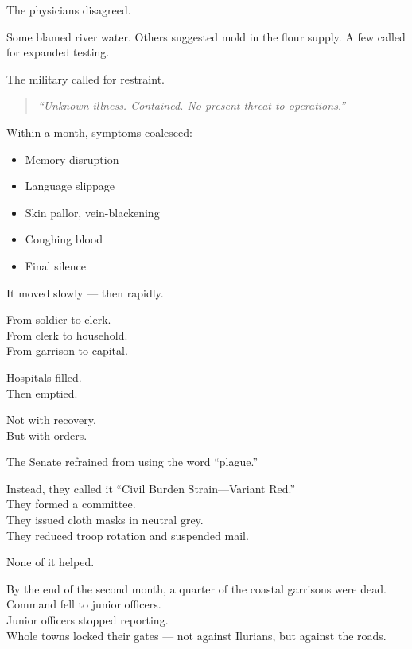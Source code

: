 \documentclass[12pt]{article}
\begin{document}
The physicians disagreed.

Some blamed river water. Others suggested mold in the flour supply. A few called for expanded testing.

The military called for restraint.

\begin{quote}
\textit{“Unknown illness. Contained. No present threat to operations.”}
\end{quote}

\vspace{1em}

Within a month, symptoms coalesced:

\begin{itemize}
  \item Memory disruption
  \item Language slippage
  \item Skin pallor, vein-blackening
  \item Coughing blood
  \item Final silence
\end{itemize}

It moved slowly — then rapidly.

From soldier to clerk.\\
From clerk to household.\\
From garrison to capital.

Hospitals filled.\\
Then emptied.

Not with recovery.\\
But with orders.

\vspace{1em}

The Senate refrained from using the word “plague.”

Instead, they called it “Civil Burden Strain—Variant Red.”\\
They formed a committee.\\
They issued cloth masks in neutral grey.\\
They reduced troop rotation and suspended mail.

None of it helped.

\vspace{1em}

By the end of the second month, a quarter of the coastal garrisons were dead.\\
Command fell to junior officers.\\
Junior officers stopped reporting.\\
Whole towns locked their gates — not against Ilurians, but against the roads.
\end{document}
